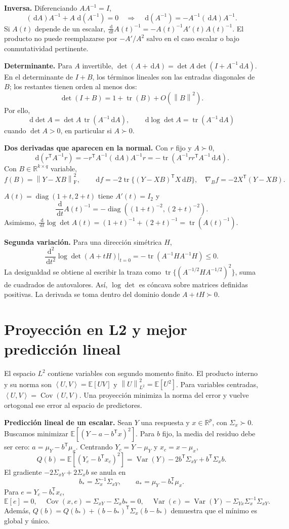 \documentclass[11pt,a4paper]{article}
\newcommand{\R}{\mathbb R}
\newcommand{\E}{\mathbb E}
\newcommand{\T}{^{\mathsf T}}
\newcommand{\dd}{\,\mathrm d}
\newcommand{\norm}[1]{\left\lVert #1\right\rVert}
\newcommand{\ip}[2]{\left\langle #1,#2\right\rangle}
\DeclareMathOperator{\Var}{Var}
\DeclareMathOperator{\Cov}{Cov}
\DeclareMathOperator{\tr}{tr}
\DeclareMathOperator{\diag}{diag}
\newcommand{\F}{_{\mathrm F}}
\newcommand{\topic}[2]{\clearpage\section{#1}\label{#2}}
\theoremstyle{definition}\newtheorem{definicion}[teorema]{Definición}
\begin{document}
\textbf{Inversa.} Diferenciando $AA^{-1}=I$,
\[
(\dd A)A^{-1}+A\,\dd(A^{-1})=0
\quad\Longrightarrow\quad
\boxed{\dd(A^{-1})=-A^{-1}(\dd A)A^{-1}}.
\]
Si $A(t)$ depende de un escalar,
$\frac{\dd}{\dd t}A(t)^{-1}=-A(t)^{-1}A'(t)A(t)^{-1}$.
El producto no puede reemplazarse por $-A'/A^2$ salvo en el caso escalar
o bajo conmutatividad pertinente.

\textbf{Determinante.} Para $A$ invertible,
$\det(A+\dd A)=\det A\det(I+A^{-1}\dd A)$.
En el determinante de $I+B$, los términos lineales son las entradas
diagonales de $B$; los restantes tienen orden al menos dos:
\[
\det(I+B)=1+\tr(B)+O(\norm B^2).
\]
Por ello,
\[
\dd\det A=\det A\,\tr(A^{-1}\dd A),\qquad
\boxed{\dd\log\det A=\tr(A^{-1}\dd A)}
\]
cuando $\det A>0$, en particular si $A\succ0$.

\textbf{Dos derivadas que aparecen en la normal.}
Con $r$ fijo y $A\succ0$,
\[
\dd(r\T A^{-1}r)
=-r\T A^{-1}(\dd A)A^{-1}r
=-\tr(A^{-1}rr\T A^{-1}\dd A).
\]
Con $B\in\R^{k\times q}$ variable,
\[
f(B)=\norm{Y-XB}\F^2,\qquad
\dd f=-2\tr\{(Y-XB)\T X\dd B\},
\quad \nabla_Bf=-2X\T(Y-XB).
\]

\begin{ejemplo}
$A(t)=\diag(1+t,2+t)$ tiene
$A'(t)=I_2$ y
\[
\frac{\dd}{\dd t}A(t)^{-1}
=-\diag((1+t)^{-2},(2+t)^{-2}).
\]
Asimismo,
$\frac{\dd}{\dd t}\log\det A(t)
=(1+t)^{-1}+(2+t)^{-1}=\tr(A(t)^{-1})$.
\end{ejemplo}
\textbf{Segunda variación.} Para una dirección simétrica $H$,
\[
\frac{\dd^2}{\dd t^2}\log\det(A+tH)\bigg|_{t=0}
=-\tr(A^{-1}HA^{-1}H)\le0.
\]
La desigualdad se obtiene al escribir la traza como
$\tr\{(A^{-1/2}HA^{-1/2})^2\}$, suma de cuadrados de autovalores.
Así, $\log\det$ es cóncava sobre matrices definidas positivas.
La derivada se toma dentro del dominio donde $A+tH\succ0$.

\topic{Proyección en L2 y mejor predicción lineal}{s17}
El espacio $L^2$ contiene variables con segundo momento finito. El producto
interno y su norma son
$\ip UV=\E[UV]$ y $\norm U_{L^2}^2=\E[U^2]$.
Para variables centradas, $\ip UV=\Cov(U,V)$.
Una proyección minimiza la norma del error y vuelve ortogonal ese error
al espacio de predictores.

\textbf{Predicción lineal de un escalar.}
Sean $Y$ una respuesta y $x\in\R^p$, con $\Sigma_x\succ0$.
Buscamos minimizar $\E[(Y-a-b\T x)^2]$.
Para $b$ fijo, la media del residuo debe ser cero:
$a=\mu_Y-b\T\mu_x$.
Centrando $Y_c=Y-\mu_Y$ y $x_c=x-\mu_x$,
\[
Q(b)=\E[(Y_c-b\T x_c)^2]
=\Var(Y)-2b\T\Sigma_{xY}+b\T\Sigma_x b.
\]
El gradiente $-2\Sigma_{xY}+2\Sigma_xb$ se anula en
\[
\boxed{b_*=\Sigma_x^{-1}\Sigma_{xY},\qquad
a_*=\mu_Y-b_*\T\mu_x}.
\]
Para $e=Y_c-b_*\T x_c$,
\[
\E[e]=0,\quad \Cov(x,e)=\Sigma_{xY}-\Sigma_xb_*=0,
\quad
\Var(e)=\Var(Y)-\Sigma_{Yx}\Sigma_x^{-1}\Sigma_{xY}.
\]
Además, $Q(b)=Q(b_*)+(b-b_*)\T\Sigma_x(b-b_*)$ demuestra que el
mínimo es global y único.
\end{document}
